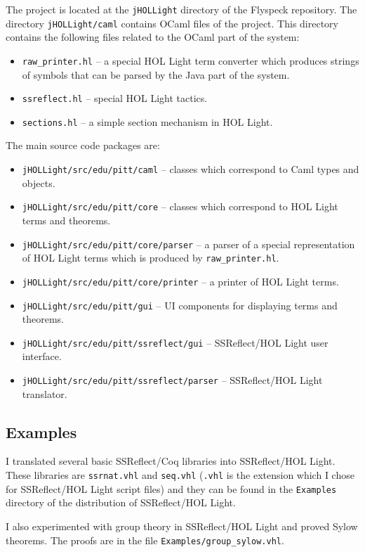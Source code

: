 \documentclass[a4paper]{article}
\begin{document}
The project is located at the {\tt jHOLLight} directory of the Flyspeck repository. The directory {\tt jHOLLight/caml} contains OCaml files of the project. This directory contains the following files related to the OCaml part of the system:
\begin{itemize}
\item {\tt raw\_printer.hl} -- a special HOL Light term converter which produces strings of symbols that can be parsed by the Java part of the system.
\item {\tt ssreflect.hl} -- special HOL Light tactics.
\item {\tt sections.hl} -- a simple section mechanism in HOL Light.
\end{itemize}

The main source code packages are:
\begin{itemize}
\item {\tt jHOLLight/src/edu/pitt/caml} -- classes which correspond to Caml types and objects.
\item {\tt jHOLLight/src/edu/pitt/core} -- classes which correspond to HOL Light terms and theorems.
\item {\tt jHOLLight/src/edu/pitt/core/parser} -- a parser of a special representation of HOL Light terms which is produced by {\tt raw\_printer.hl}.
\item {\tt jHOLLight/src/edu/pitt/core/printer} -- a printer of HOL Light terms.
\item {\tt jHOLLight/src/edu/pitt/gui} -- UI components for displaying terms and theorems.
\item {\tt jHOLLight/src/edu/pitt/ssreflect/gui} -- SSReflect/HOL Light user interface.
\item {\tt jHOLLight/src/edu/pitt/ssreflect/parser} -- SSReflect/HOL Light translator.
\end{itemize}


\subsection{Examples}
I translated several basic SSReflect/Coq libraries into SSReflect/HOL Light. These libraries are {\tt ssrnat.vhl} and {\tt seq.vhl} ({\tt .vhl} is the extension which I chose for SSReflect/HOL Light script files) and they can be found in the {\tt Examples} directory of the distribution of SSReflect/HOL Light.

I also experimented with group theory in SSReflect/HOL Light and proved Sylow theorems. The proofs are in the file {\tt Examples/group\_sylow.vhl}.
\end{document}
